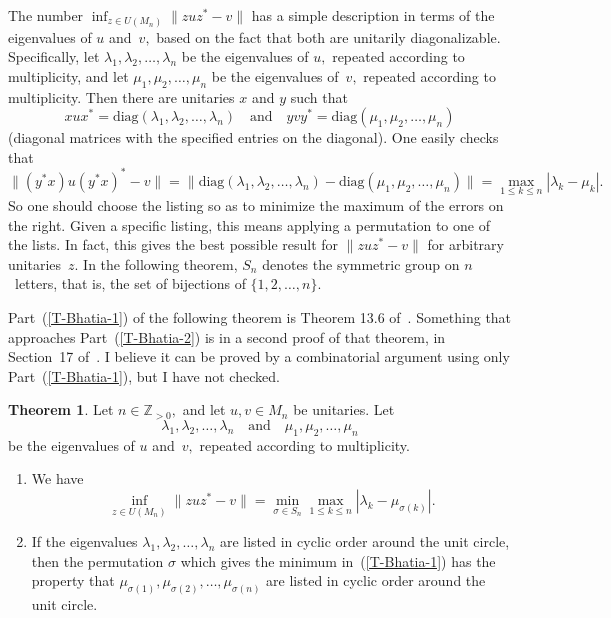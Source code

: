 \documentclass[10pt]{amsart}
\theoremstyle{definition}
\newtheorem{thm}{Theorem}[section]
\newcommand{\ld}{\lambda}
\newcommand{\sm}{\sigma}
\newcommand{\N}{{\mathbb{Z}}_{> 0}}
\newcommand{\diag}{{\mathrm{diag}}}
\newcommand{\andeqn}{\,\,\,\,\,\, {\mbox{and}} \,\,\,\,\,\,}
\begin{document}
The number
$\inf_{z \in U (M_n)} \| z u z^* - v \|$ has a simple
description in terms of the eigenvalues of $u$ and~$v,$
based on the fact that both are unitarily diagonalizable.
Specifically, let $\ld_1, \ld_2, \dots, \ld_n$ be the
eigenvalues of $u,$ repeated according to multiplicity,
and let $\mu_1, \mu_2, \dots, \mu_n$ be the
eigenvalues of~$v,$ repeated according to multiplicity.
Then there are unitaries $x$ and $y$ such that
\[
x u x^* = \diag (\ld_1, \ld_2, \dots, \ld_n)
\andeqn
y v y^* = \diag (\mu_1, \mu_2, \dots, \mu_n)
\]
(diagonal matrices with the specified entries on the diagonal).
One easily checks that
\[
\| (y^* x) u (y^* x)^* - v \|
 = \| \diag (\ld_1, \ld_2, \dots, \ld_n) -
            \diag (\mu_1, \mu_2, \dots, \mu_n) \|
 = \max_{1 \leq k \leq n} | \ld_k - \mu_k |.
\]
So one should choose the listing so as to minimize the maximum
of the errors on the right.
Given a specific listing, this means applying a permutation
to one of the lists.
In fact, this gives the best possible result for $\| z u z^* - v \|$
for arbitrary unitaries~$z.$
In the following theorem,
$S_n$ denotes the symmetric group on $n$~letters,
that is, the set of bijections of $\{ 1, 2, \ldots, n \}.$

Part~(\ref{T-Bhatia-1}) of the following theorem is
Theorem 13.6 of~\cite{Bh}.
Something that approaches Part~(\ref{T-Bhatia-2})
is in a second proof of that theorem,
in Section~17 of~\cite{Bh}.
I believe it can be proved by a combinatorial argument
using only Part~(\ref{T-Bhatia-1}),
but I have not checked.

\begin{thm}\label{T-Bhatia}
Let $n \in \N,$ and let $u, v \in M_n$ be unitaries.
Let
\[
\ld_1, \ld_2, \dots, \ld_n
\andeqn
\mu_1, \mu_2, \dots, \mu_n
\]
be the eigenvalues of $u$ and~$v,$
repeated according to multiplicity.
\begin{enumerate}
\item\label{T-Bhatia-1}
We have
\[
\inf_{z \in U (M_n)} \| z u z^* - v \| =
 \min_{\sm \in S_n}
              \max_{1 \leq k \leq n} | \ld_k - \mu_{\sm (k)} |.
\]
\item\label{T-Bhatia-2}
If the eigenvalues $\ld_1, \ld_2, \dots, \ld_n$ are listed
in cyclic order around the unit circle, then the permutation $\sm$
which gives the minimum in~(\ref{T-Bhatia-1}) has the property that
$\mu_{\sm (1)}, \mu_{\sm (2)}, \dots, \mu_{\sm (n)}$ are listed
in cyclic order around the unit circle.
\end{enumerate}
\end{thm}
\end{document}
